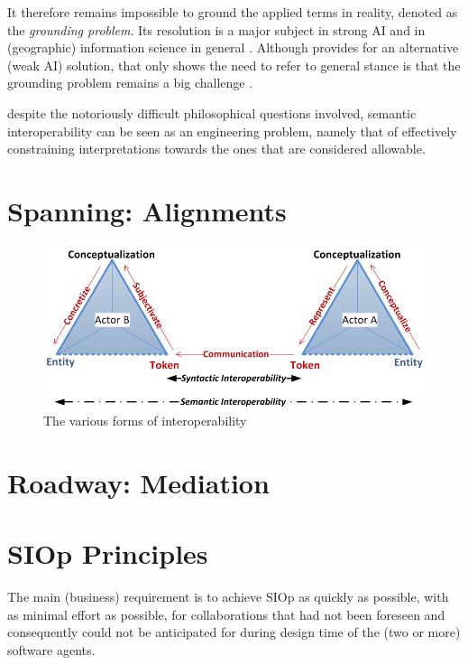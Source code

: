 \documentclass[a4paper,11pt,oneside,oldfontcommands]{memoir}
\theoremstyle{definition}
\theoremstyle{break}		%
\numberwithin{equation}{chapter}
\numberwithin{figure}{chapter}
\begin{document}
It therefore remains impossible to ground the applied terms in reality,
denoted as the \emph{grounding problem}. Its resolution is a major
subject in strong AI and in (geographic) information science in general
\cite{Scheider:2012tj}. Although \cite{Steels:2008tr} provides for an
alternative (weak AI) solution, that only shows the need to refer to
general stance is that the grounding problem remains a big challenge .

despite the notoriously difficult philosophical questions involved,
semantic interoperability can be seen as an engineering problem, namely
that of effectively constraining interpretations towards the ones that
are considered allowable.

\hypertarget{spanning-alignments}{%
\chapter{Spanning: Alignments}\label{spanning-alignments}}

\begin{figure}
\hypertarget{fig:2semiotic-triangles}{%
\centering
\includegraphics[width=6.25in,height=\textheight]{src/images/2SemioticTriangles.png}
\caption{The various forms of
interoperability}\label{fig:2semiotic-triangles}
}
\end{figure}

\hypertarget{roadway-mediation}{%
\chapter{Roadway: Mediation}\label{roadway-mediation}}

\hypertarget{siop-principles}{%
\chapter{SIOp Principles}\label{siop-principles}}

The main (business) requirement is to achieve SIOp as quickly as
possible, with as minimal effort as possible, for collaborations that
had not been foreseen and consequently could not be anticipated for
during design time of the (two or more) software agents.
\end{document}

